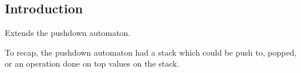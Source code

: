 
\subsection{Introduction}

Extends the pushdown automaton.

To recap, the pushdown automaton had a stack which could be push to, popped, or an operation done on top values on the stack.


